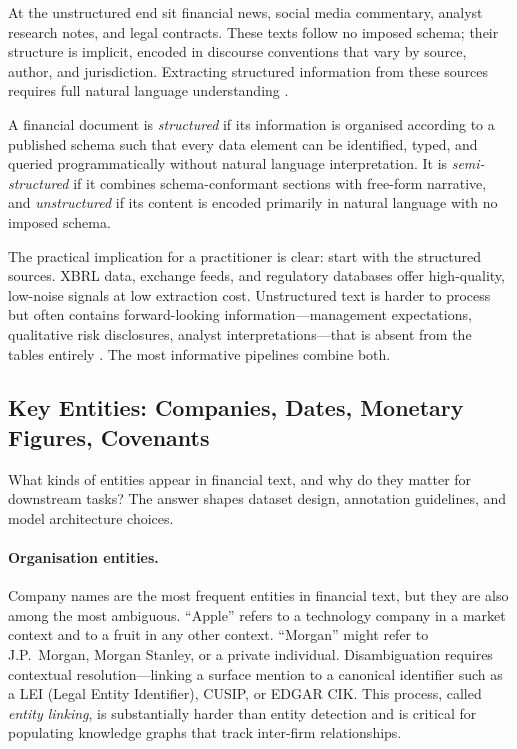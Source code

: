 At the unstructured end sit financial news, social media commentary, analyst research
notes, and legal contracts. These texts follow no imposed schema; their structure is
implicit, encoded in discourse conventions that vary by source, author, and jurisdiction.
Extracting structured information from these sources requires full natural language
understanding \cite{tetlock2008words}.

\begin{definition}
\label{def:structured-text}
A financial document is \emph{structured} if its information is organised according to
a published schema such that every data element can be identified, typed, and queried
programmatically without natural language interpretation. It is \emph{semi-structured}
if it combines schema-conformant sections with free-form narrative, and \emph{unstructured}
if its content is encoded primarily in natural language with no imposed schema.
\end{definition}

The practical implication for a practitioner is clear: start with the structured sources.
XBRL data, exchange feeds, and regulatory databases offer high-quality, low-noise signals
at low extraction cost. Unstructured text is harder to process but often contains
forward-looking information---management expectations, qualitative risk disclosures,
analyst interpretations---that is absent from the tables entirely \cite{li2008annual}.
The most informative pipelines combine both.

\subsection{Key Entities: Companies, Dates, Monetary Figures, Covenants}
\label{sec:ch14-key-entities}

What kinds of entities appear in financial text, and why do they matter for downstream
tasks? The answer shapes dataset design, annotation guidelines, and model architecture
choices.

\paragraph*{Organisation entities.} Company names are the most frequent entities in
financial text, but they are also among the most ambiguous. ``Apple'' refers to a
technology company in a market context and to a fruit in any other context. ``Morgan''
might refer to J.P.\ Morgan, Morgan Stanley, or a private individual. Disambiguation
requires contextual resolution---linking a surface mention to a canonical identifier
such as a LEI (Legal Entity Identifier), CUSIP, or EDGAR CIK. This process, called
\emph{entity linking}, is substantially harder than entity detection and is critical for
populating knowledge graphs that track inter-firm relationships.

